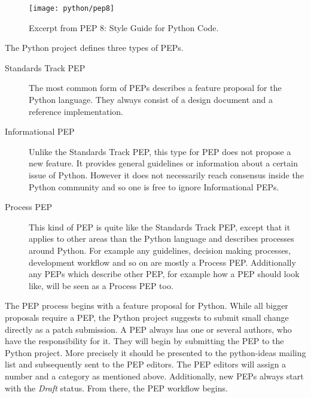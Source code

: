 \begin{figure}[htbp]
  \centering
  \texttt{[image: python/pep8]}
  \caption{Excerpt from \ac{PEP} 8: Style Guide for Python Code.}
\end{figure}

The Python project defines three types of \acp{PEP}.

\begin{description}

  \item[Standards Track PEP] The most common form of \acp{PEP} describes a
    feature proposal for the Python language. They always consist of a design
    document and a reference implementation.

  \item[Informational PEP] Unlike the Standards Track \ac{PEP}, this type for
    \ac{PEP} does not propose a new feature. It provides general guidelines or
    information about a certain issue of Python. However it does not
    necessarily reach consensus inside the Python community and so one is free
    to ignore Informational \acp{PEP}.

  \item[Process PEP] This kind of \ac{PEP} is quite like the Standards Track
    \ac{PEP}, except that it applies to other areas than the Python language
    and describes processes around Python. For example any guidelines, decision
    making processes, development workflow and so on are mostly a Process
    \ac{PEP}. Additionally any \acp{PEP} which describe other \ac{PEP}, for
    example how a \ac{PEP} should look like, will be seen as a Process \ac{PEP}
    too.

\end{description}

The \ac{PEP} process begins with a feature proposal for Python. While all
bigger proposals require a \ac{PEP}, the Python project suggests to submit
small change directly as a patch submission. A \ac{PEP} always has one or
several authors, who have the responsibility for it. They will begin by
submitting the \ac{PEP} to the Python project. More precisely it should be
presented to the python-ideas mailing list and subsequently sent to the
\ac{PEP} editors. The \ac{PEP} editors will assign a number and a category as
mentioned above. Additionally, new \acp{PEP} always start with the \emph{Draft}
status. From there, the \ac{PEP} workflow begins.

